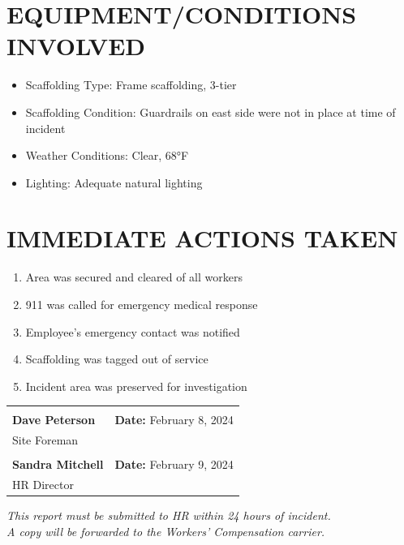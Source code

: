 \documentclass[11pt]{article}
\begin{document}
\section*{EQUIPMENT/CONDITIONS INVOLVED}

\begin{itemize}
\item Scaffolding Type: Frame scaffolding, 3-tier
\item Scaffolding Condition: Guardrails on east side were not in place at time of incident
\item Weather Conditions: Clear, 68°F
\item Lighting: Adequate natural lighting
\end{itemize}

\section*{IMMEDIATE ACTIONS TAKEN}

\begin{enumerate}
\item Area was secured and cleared of all workers
\item 911 was called for emergency medical response
\item Employee's emergency contact was notified
\item Scaffolding was tagged out of service
\item Incident area was preserved for investigation
\end{enumerate}

\vspace{2em}

\begin{tabular}{@{}p{7cm}p{7cm}@{}}
\hrulefill & \hrulefill \\
\textbf{Dave Peterson} & \textbf{Date:} February 8, 2024 \\
Site Foreman & \\[2em]
\hrulefill & \hrulefill \\
\textbf{Sandra Mitchell} & \textbf{Date:} February 9, 2024 \\
HR Director & \\
\end{tabular}

\vspace{1em}
\begin{center}
\small\textit{This report must be submitted to HR within 24 hours of incident.\\
A copy will be forwarded to the Workers' Compensation carrier.}
\end{center}
\end{document}
